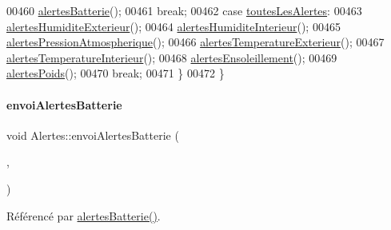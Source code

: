 \begin{DoxyCode}
00460             \hyperlink{class_alertes_ad708a4b800d56c1439b65d12a3c6b027}{alertesBatterie}();
00461         \textcolor{keywordflow}{break};
00462         \textcolor{keywordflow}{case} \hyperlink{parametres_8h_a83a725fd153179a2bd97afcc8307737ba673fe6d70f1b196ef95a63009d855e08}{toutesLesAlertes}:
00463             \hyperlink{class_alertes_a8606946eaa04dfd29bb7951b2b850a04}{alertesHumiditeExterieur}();
00464             \hyperlink{class_alertes_a7558cb097dc392547ceb12ab4d6cbd4c}{alertesHumiditeInterieur}();
00465             \hyperlink{class_alertes_ab8a33e82cdd4d4e0560c9ba6e10ca8d5}{alertesPressionAtmospherique}();
00466             \hyperlink{class_alertes_a91fb2665fa8b6c32c74bfe4d1b89a2d8}{alertesTemperatureExterieur}();
00467             \hyperlink{class_alertes_a8bc56cf9eb525624b2c1f5b20f86724b}{alertesTemperatureInterieur}();
00468             \hyperlink{class_alertes_ae7ad960c530a6a7e82df3ed55d159a68}{alertesEnsoleillement}();
00469             \hyperlink{class_alertes_ac4b8925cc6c262cf7254b1576ba07d33}{alertesPoids}();
00470         \textcolor{keywordflow}{break};
00471     \}
00472 \}
\end{DoxyCode}
\mbox{\label{class_alertes_a0e81d795f8e7559eab19fcb9be138f5f}} 
\paragraph{\texorpdfstring{envoi\+Alertes\+Batterie}{envoiAlertesBatterie}}
{\footnotesize\ttfamily void Alertes\+::envoi\+Alertes\+Batterie (\begin{DoxyParamCaption}\item[{\hyperlink{parametres_8h_aaa6de8207c94675264c90b10b613368d}{Seuils\+Alertes}}]{,  }\item[{double}]{ }\end{DoxyParamCaption})\hspace{0.3cm}{\ttfamily [signal]}}



Référencé par \hyperlink{class_alertes_ad708a4b800d56c1439b65d12a3c6b027}{alertes\+Batterie()}.

\mbox{\label{class_alertes_a578aa70bc7ca4ec753aa7f97e90f7f02}} 
